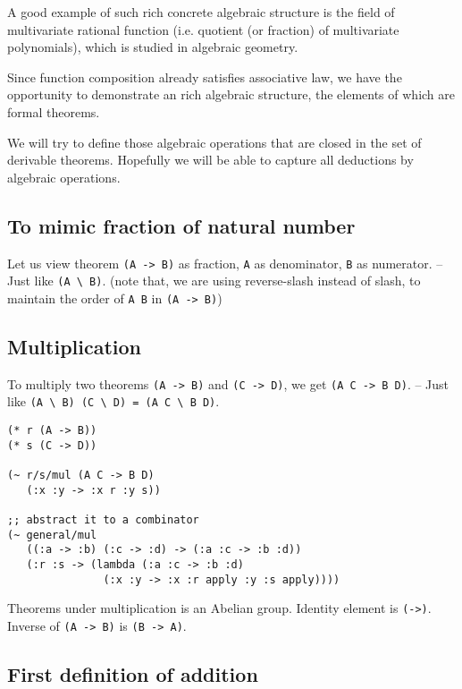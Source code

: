 \documentclass[numbers]{sigplanconf}
\begin{document}
A good example of such rich concrete algebraic structure
is the field of multivariate rational function
(i.e. quotient (or fraction) of multivariate polynomials),
which is studied in algebraic geometry.

Since function composition already satisfies associative law,
we have the opportunity to demonstrate an rich algebraic structure,
the elements of which are formal theorems.

We will try to define those algebraic operations that are closed in the set of derivable theorems.
Hopefully we will be able to capture all deductions by algebraic operations.

\subsection{To mimic fraction of natural number}

Let us view theorem {\scriptsize\verb|(A -> B)|} as fraction,
{\scriptsize\verb|A|} as denominator,
{\scriptsize\verb|B|} as numerator.
-- Just like {\scriptsize\verb|(A \ B)|}.
(note that,
we are using reverse-slash instead of slash,
to maintain the order of {\scriptsize\verb|A B|} in {\scriptsize\verb|(A -> B)|})

\subsection{Multiplication}

To multiply two theorems {\scriptsize\verb|(A -> B)|} and {\scriptsize\verb|(C -> D)|},
we get {\scriptsize\verb|(A C -> B D)|}.
-- Just like {\scriptsize\verb|(A \ B) (C \ D) = (A C \ B D)|}.

{\scriptsize\begin{verbatim}
(* r (A -> B))
(* s (C -> D))

(~ r/s/mul (A C -> B D)
   (:x :y -> :x r :y s))

;; abstract it to a combinator
(~ general/mul
   ((:a -> :b) (:c -> :d) -> (:a :c -> :b :d))
   (:r :s -> (lambda (:a :c -> :b :d)
               (:x :y -> :x :r apply :y :s apply))))
\end{verbatim}}

Theorems under multiplication is an Abelian group.
Identity element is {\scriptsize\verb|(->)|}.
Inverse of {\scriptsize\verb|(A -> B)|} is {\scriptsize\verb|(B -> A)|}.

\subsection{First definition of addition}
\end{document}
